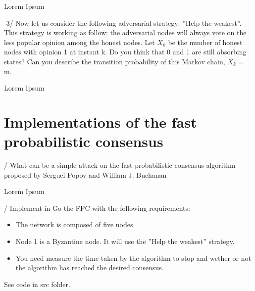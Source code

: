 \documentclass[11pt]{article}
\begin{document}
Lorem Ipsum

\vspace{5mm}

-3/ Now let us consider the following adversarial strategy: ”Help the weakest”. This strategy is
working as follow: the adversarial nodes will always vote on the less popular opinion among
the honest nodes. Let $\overline{X_{k}}$ be the number of honest nodes with opinion 1 at instant k. Do you
think that 0 and 1 are still absorbing states? Can you describe the transition probability of this
Markov chain, $\overline{X_{k}}$ = m.

\vspace{5mm}

Lorem Ipsum

\vspace{10mm}

\section{Implementations of the fast probabilistic consensus}

\vspace{5mm}

/ What can be a simple attack on the fast probabilistic consensus algorithm proposed
by Serguei Popov and William J. Buchanan

\vspace{5mm}

Lorem Ipsum

\vspace{5mm}

/ Implement in Go the FPC with the following requirements:
\begin{itemize}
    \item The network is composed of five nodes.
    \item Node 1 is a Byzantine node. It will use the ”Help the weakest” strategy.
    \item You need measure the time taken by the algorithm to stop and wether or not the algorithm has
    reached the desired consensus.
\end{itemize}

\vspace{5mm}

\noindent See code in src folder.



\end{document}
